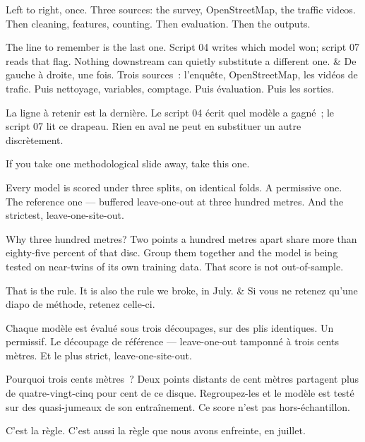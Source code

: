 \documentclass[10pt,a4paper]{article}
\begin{document}
\begin{say}
Left to right, once. Three sources: the survey, OpenStreetMap, the traffic
videos. Then cleaning, features, counting. Then evaluation. Then the outputs.

The line to remember is the last one.  Script 04 writes which model won; script 07 reads that flag.
Nothing downstream can quietly substitute a different one.
&
De gauche à droite, une fois. Trois sources~: l'enquête, OpenStreetMap, les
vidéos de trafic. Puis nettoyage, variables, comptage. Puis évaluation. Puis les
sorties.

La ligne à retenir est la dernière.  Le script 04 écrit quel modèle a gagné~; le script 07 lit ce
drapeau. Rien en aval ne peut en substituer un autre discrètement.
\end{say}

\begin{say}
If you take one methodological slide away, take this one.

Every model is scored under three splits, on identical folds. A permissive one.
The reference one --- buffered leave-one-out at three hundred metres. And the
strictest, leave-one-site-out.

Why three hundred metres?  Two points a hundred metres apart share more than
eighty-five percent of that disc. Group them together and the model is being
tested on near-twins of its own training data. That score is not out-of-sample.

 That is the rule. It is also the
rule we broke, in July.
&
Si vous ne retenez qu'une diapo de méthode, retenez celle-ci.

Chaque modèle est évalué sous trois découpages, sur des plis identiques. Un
permissif. Le découpage de référence --- leave-one-out tamponné à trois cents
mètres. Et le plus strict, leave-one-site-out.

Pourquoi trois cents mètres~?  Deux points distants de cent mètres partagent plus
de quatre-vingt-cinq pour cent de ce disque. Regroupez-les et le modèle est testé
sur des quasi-jumeaux de son entraînement. Ce score n'est pas hors-échantillon.

 C'est la règle. C'est aussi
la règle que nous avons enfreinte, en juillet.
\end{say}
\end{document}
